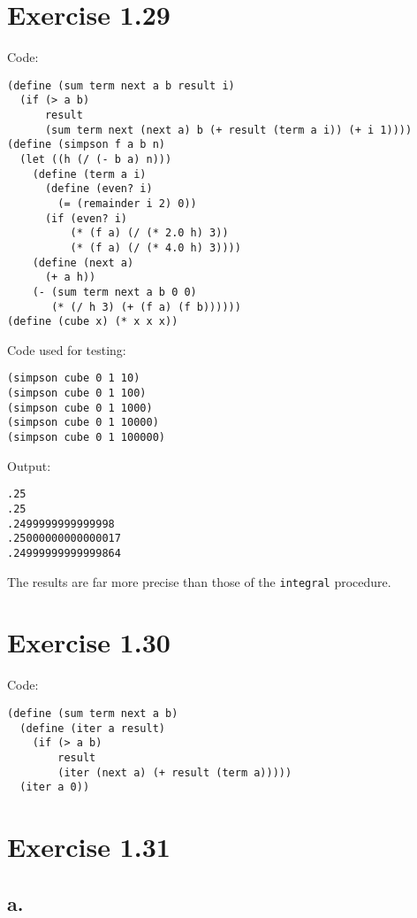 \documentclass[../main.tex]{subfiles}
\begin{document}
\section{Exercise 1.29}

Code:

\begin{lstlisting}
(define (sum term next a b result i)
  (if (> a b)
      result
      (sum term next (next a) b (+ result (term a i)) (+ i 1))))
(define (simpson f a b n)
  (let ((h (/ (- b a) n)))
    (define (term a i)
      (define (even? i)
        (= (remainder i 2) 0))
      (if (even? i)
          (* (f a) (/ (* 2.0 h) 3))
          (* (f a) (/ (* 4.0 h) 3))))
    (define (next a)
      (+ a h))
    (- (sum term next a b 0 0)
       (* (/ h 3) (+ (f a) (f b))))))
(define (cube x) (* x x x))
\end{lstlisting}

Code used for testing:

\begin{lstlisting}
(simpson cube 0 1 10)
(simpson cube 0 1 100)
(simpson cube 0 1 1000)
(simpson cube 0 1 10000)
(simpson cube 0 1 100000)
\end{lstlisting}

Output:

\begin{lstlisting}
.25
.25
.2499999999999998
.25000000000000017
.24999999999999864
\end{lstlisting}

The results are far more precise than
 those of the \lstinline{integral}
 procedure.

\section{Exercise 1.30}

Code:

\begin{lstlisting}
(define (sum term next a b)
  (define (iter a result)
    (if (> a b)
        result
        (iter (next a) (+ result (term a)))))
  (iter a 0))
\end{lstlisting}

\section{Exercise 1.31}

\subsection*{a.}
\end{document}
